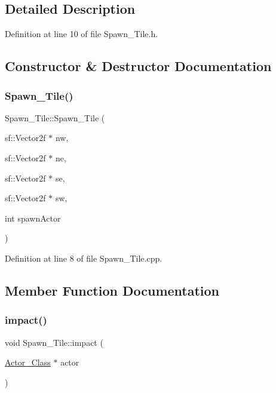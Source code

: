 \subsection{Detailed Description}


Definition at line 10 of file Spawn\+\_\+\+Tile.\+h.



\subsection{Constructor \& Destructor Documentation}
\hypertarget{class_spawn___tile_a9491bac6cc501fb9f0febde42533fc1d}{}\label{class_spawn___tile_a9491bac6cc501fb9f0febde42533fc1d} 
\subsubsection{\texorpdfstring{Spawn\+\_\+\+Tile()}{Spawn\_Tile()}}
{\footnotesize\ttfamily Spawn\+\_\+\+Tile\+::\+Spawn\+\_\+\+Tile (\begin{DoxyParamCaption}\item[{sf\+::\+Vector2f $\ast$}]{nw,  }\item[{sf\+::\+Vector2f $\ast$}]{ne,  }\item[{sf\+::\+Vector2f $\ast$}]{se,  }\item[{sf\+::\+Vector2f $\ast$}]{sw,  }\item[{int}]{spawn\+Actor }\end{DoxyParamCaption})}



Definition at line 8 of file Spawn\+\_\+\+Tile.\+cpp.



\subsection{Member Function Documentation}
\hypertarget{class_spawn___tile_a9b557377a8afd06512ac19368a4f14a4}{}\label{class_spawn___tile_a9b557377a8afd06512ac19368a4f14a4} 
\subsubsection{\texorpdfstring{impact()}{impact()}}
{\footnotesize\ttfamily void Spawn\+\_\+\+Tile\+::impact (\begin{DoxyParamCaption}\item[{\hyperlink{class_actor___class}{Actor\+\_\+\+Class} $\ast$}]{actor }\end{DoxyParamCaption})\hspace{0.3cm}{\ttfamily [virtual]}}



